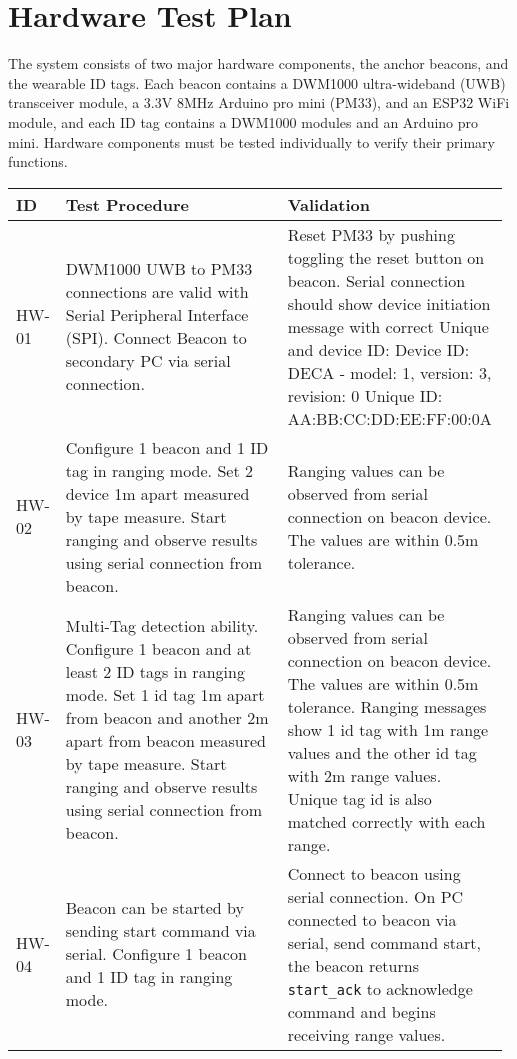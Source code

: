

\setcounter{section}{2}
\section{Hardware Test Plan}
\bigskip

The system consists of two major hardware components, the anchor beacons, and the wearable ID tags. Each beacon contains a DWM1000 ultra-wideband (UWB) transceiver module, a 3.3V 8MHz Arduino pro mini (PM33), and an ESP32 WiFi module, and each ID tag contains a DWM1000 modules and an Arduino pro mini. Hardware components must be tested individually to verify their primary functions.


\bigskip
\bgroup
\def\arraystretch{1.3}
\begin{table}[h!]
    \centering
    \begin{tabular}{|p{0.075\linewidth}|p{0.45\linewidth}|p{0.45\linewidth}|} 
    \hline
    ID & Test Procedure & Validation\\ 

    \hline
    HW-01
	& DWM1000 UWB to PM33 connections are valid with Serial Peripheral Interface (SPI). Connect Beacon to secondary PC via serial connection.
	& Reset PM33 by pushing toggling the reset button on beacon. Serial connection should show device initiation message with correct Unique and device ID:
Device ID: DECA - model: 1, version: 3, revision: 0
Unique ID: AA:BB:CC:DD:EE:FF:00:0A \\ 
     
    \hline  
    HW-02
	& Configure 1 beacon and 1 ID tag in ranging mode. Set 2 device 1m apart measured by tape measure. Start ranging and observe results using serial connection from beacon.
	& Ranging values can be observed from serial connection on beacon device. The values are within 0.5m tolerance.\\

	\hline  
	HW-03
	& Multi-Tag detection ability. Configure 1 beacon and at least 2 ID tags in ranging mode. Set 1 id tag 1m apart from beacon and another 2m apart from beacon measured by tape measure. Start ranging and observe results using serial connection from beacon.
	& Ranging values can be observed from serial connection on beacon device. The values are within 0.5m tolerance. Ranging messages show 1 id tag with 1m range values and the other id tag with 2m range values. Unique tag id is also matched correctly with each range. \\
	
	\hline  
	HW-04
	& Beacon can be started by sending start command via serial. Configure 1 beacon and 1 ID tag in ranging mode.
	& Connect to beacon using serial connection.
	On PC connected to beacon via serial, send command start, the beacon returns \texttt{start\_ack} to acknowledge command and begins receiving range values.\\
	

\end{tabular}
\end{table}
